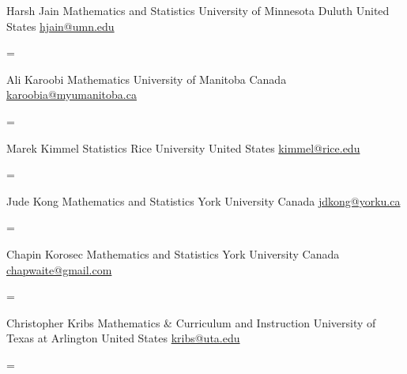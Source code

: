 \documentclass[
  letterpaper,
  DIV=11,
  numbers=noendperiod]{scrartcl}
\newenvironment{absolutelynopagebreak}
  {\par\nobreak\vfil\penalty0\vfilneg
   \vtop\bgroup}
  {\par\xdef\tpd{\the\prevdepth}\egroup
   \prevdepth=\tpd}
\begin{document}
\begin{absolutelynopagebreak}Harsh   Jain \newline
\mbox{}\quad  Mathematics and Statistics \newline
\mbox{}\quad  University of Minnesota Duluth \newline
\mbox{}\quad  United States \newline
\mbox{}\quad \href{mailto: hjain@umn.edu }{ hjain@umn.edu }
\end{absolutelynopagebreak}\vskip0.2cm
\begin{absolutelynopagebreak}Ali   Karoobi \newline
\mbox{}\quad  Mathematics \newline
\mbox{}\quad  University of Manitoba \newline
\mbox{}\quad  Canada \newline
\mbox{}\quad \href{mailto: karoobia@myumanitoba.ca }{ karoobia@myumanitoba.ca }
\end{absolutelynopagebreak}\vskip0.2cm
\begin{absolutelynopagebreak}Marek   Kimmel \newline
\mbox{}\quad  Statistics \newline
\mbox{}\quad  Rice University \newline
\mbox{}\quad  United States \newline
\mbox{}\quad \href{mailto: kimmel@rice.edu }{ kimmel@rice.edu }
\end{absolutelynopagebreak}\vskip0.2cm
\begin{absolutelynopagebreak}Jude   Kong \newline
\mbox{}\quad  Mathematics and Statistics \newline
\mbox{}\quad  York University \newline
\mbox{}\quad  Canada \newline
\mbox{}\quad \href{mailto: jdkong@yorku.ca }{ jdkong@yorku.ca }
\end{absolutelynopagebreak}\vskip0.2cm
\begin{absolutelynopagebreak}Chapin   Korosec \newline
\mbox{}\quad  Mathematics and Statistics \newline
\mbox{}\quad  York University \newline
\mbox{}\quad  Canada \newline
\mbox{}\quad \href{mailto: chapwaite@gmail.com }{ chapwaite@gmail.com }
\end{absolutelynopagebreak}\vskip0.2cm
\begin{absolutelynopagebreak}Christopher   Kribs \newline
\mbox{}\quad  Mathematics \& Curriculum and Instruction \newline
\mbox{}\quad  University of Texas at Arlington \newline
\mbox{}\quad  United States \newline
\mbox{}\quad \href{mailto: kribs@uta.edu }{ kribs@uta.edu }
\end{absolutelynopagebreak}\vskip0.2cm
\end{document}
